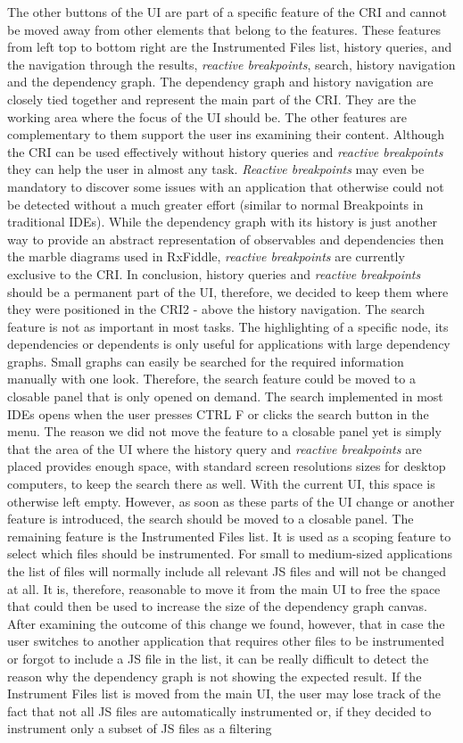 The other buttons of the UI are part of a specific feature of the CRI and cannot be moved away from other elements that belong to the features. These features from left top to bottom right are the Instrumented Files list, history queries, and the navigation through the results, \emph{reactive breakpoints}, search, history navigation and the dependency graph. The dependency graph and history navigation are closely tied together and represent the main part of the CRI. They are the working area where the focus of the UI should be. The other features are complementary to them support the user ins examining their content. Although the CRI can be used effectively without history queries and \emph{reactive breakpoints} they can help the user in almost any task. \emph{Reactive breakpoints} may even be mandatory to discover some issues with an application that otherwise could not be detected without a much greater effort (similar to normal Breakpoints in traditional IDEs). While the dependency graph with its history is just another way to provide an abstract representation of observables and dependencies then the marble diagrams used in RxFiddle, \emph{reactive breakpoints} are currently exclusive to the CRI. In conclusion, history queries and \emph{reactive breakpoints} should be a permanent part of the UI, therefore, we decided to keep them where they were positioned in the CRI2 - above the history navigation. The search feature is not as important in most tasks. The highlighting of a specific node, its dependencies or dependents is only useful for applications with large dependency graphs. Small graphs can easily be searched for the required information manually with one look. Therefore, the search feature could be moved to a closable panel that is only opened on demand. The search implemented in most IDEs opens when the user presses CTRL F or clicks the search button in the menu. The reason we did not move the feature to a closable panel yet is simply that the area of the UI where the history query and \emph{reactive breakpoints} are placed provides enough space, with standard screen resolutions sizes for desktop computers, to keep the search there as well. With the current UI, this space is otherwise left empty. However, as soon as these parts of the UI change or another feature is introduced, the search should be moved to a closable panel. The remaining feature is the Instrumented Files list. It is used as a scoping feature to select which files should be instrumented. For small to medium-sized applications the list of files will normally include all relevant JS files and will not be changed at all. It is, therefore, reasonable to move it from the main UI to free the space that could then be used to increase the size of the dependency graph canvas. After examining the outcome of this change we found, however, that in case the user switches to another application that requires other files to be instrumented or forgot to include a JS file in the list, it can be really difficult to detect the reason why the dependency graph is not showing the expected result. If the Instrument Files list is moved from the main UI, the user may lose track of the fact that not all JS files are automatically instrumented or, if they decided to instrument only a subset of JS files as a filtering 